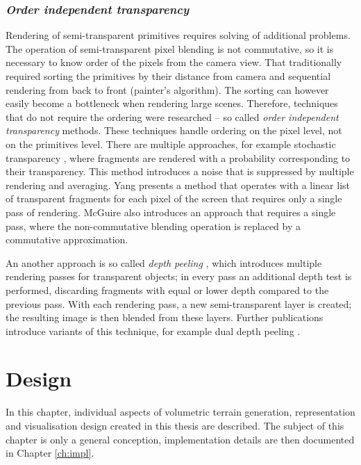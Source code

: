 
\subsection{\textit{Order independent transparency}}
Rendering of semi-transparent primitives requires solving of additional problems. The operation of semi-transparent pixel blending is not commutative, so it is necessary to know order of the pixels from the camera view. That traditionally required sorting the primitives by their distance from camera and sequential rendering from back to front (painter's algorithm). The sorting can however easily become a bottleneck when rendering large scenes. Therefore, techniques that do not require the ordering were researched -- so called \textit{order independent transparency} methods. These techniques handle ordering on the pixel level, not on the primitives level. There are multiple approaches, for example stochastic transparency \cite{EndertonE.2011ST}, where fragments are rendered with a probability corresponding to their transparency. This method introduces a noise that is suppressed by multiple rendering and averaging. Yang \cite{YangJasonC.2010RCLL} presents a method that operates with a linear list of transparent fragments for each pixel of the screen that requires only a single pass of rendering. McGuire \cite{McGuire2013Transparency} also introduces an approach that requires a single pass, where the non-commutative blending operation is replaced by a commutative approximation.

An another approach is so called \textit{depth peeling} \cite{Everitt01interactiveorder}, which introduces multiple rendering passes for transparent objects; in every pass an additional depth test is performed, discarding fragments with equal or lower depth compared to the previous pass. With each rendering pass, a new semi-transparent layer is created; the resulting image is then blended from these layers. Further publications introduce variants of this technique, for example dual depth peeling \cite{Bavoil08orderindependent}.

\chapter{Design} \label{ch:design}
In this chapter, individual aspects of volumetric terrain generation, representation and visualisation design created in this thesis are described. The subject of this chapter is only a general conception, implementation details are then documented in Chapter \ref{ch:impl}.

